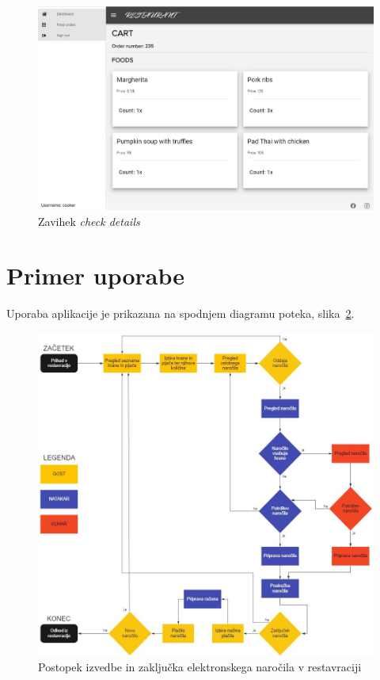 \documentclass[a4paper, 12pt]{book}
\begin{document}
\begin{figure}[!htb]
\centering
\includegraphics[width=13.7cm]{cooker_2.jpg}
\caption{Zavihek \textit{check details}}
\label{Kuhar_3}
\end{figure}

\clearpage
\section{Primer uporabe}
Uporaba aplikacije je prikazana na spodnjem diagramu poteka, slika~\ref{Diagram1}.
\begin{figure}[!htb]
\centering
\includegraphics[width=13cm]{Diagram_poteka.jpg}
\caption{Postopek izvedbe in zaključka elektronskega naročila v restavraciji}
\label{Diagram1}
\end{figure}
\end{document}
